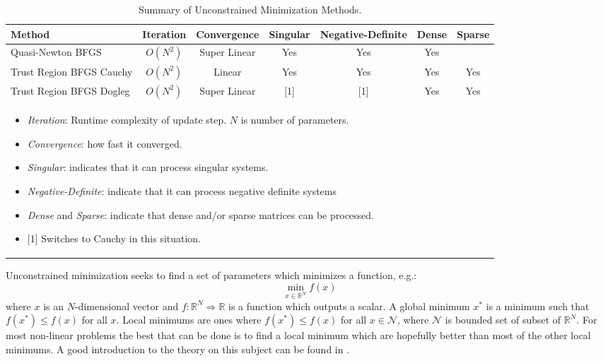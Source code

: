 \documentclass[peerreview,compsoc,onecolumn]{IEEEtran}
\newcommand{\R}{\mathbb{R}}
\begin{document}
\begin{table}[h]
\caption{\label{summary:UM}Summary of Unconstrained Minimization Methods.}
\centering
\begin{tabular}{lcccccc}
Method & Iteration & Convergence & Singular & Negative-Definite & Dense & Sparse \\[1ex]
\hline
Quasi-Newton BFGS        & $O(N^2)$ & Super Linear & Yes & Yes & Yes &  \rule{0pt}{2.6ex} \\
Trust Region BFGS Cauchy & $O(N^2)$ & Linear       & Yes & Yes & Yes & Yes  \\
Trust Region BFGS Dogleg & $O(N^2)$ & Super Linear & [1] & [1] & Yes & Yes  \\[1ex]
\hline
\multicolumn{6}{l}{
\begin{minipage}{0.6\textwidth}
\centering
\vspace{2mm}
\begin{itemize}[leftmargin=*]
\item \emph{Iteration}: Runtime complexity of update step. $N$ is number of parameters.
\item \emph{Convergence}: how fast it converged.
\item \emph{Singular}: indicates that it can process singular systems.
\item \emph{Negative-Definite}: indicate that it can process negative definite systems
\item \emph{Dense} and \emph{Sparse}: indicate that dense and/or sparse matrices can be processed. 
\item {[1]} Switches to Cauchy in this situation.
\end{itemize}
\end{minipage}
 }
\end{tabular}
\end{table}

Unconstrained minimization seeks to find a set of parameters which minimizes a function, e.g.:
\begin{equation}
\min\limits_{x \in \R^N} f(x)
\end{equation}
where $x$ is an $N$-dimensional vector and $f : \R^N \Rightarrow \R $ is a function which outputs a scalar. A global minimum $x^*$ is a minimum such that $f(x^*) \le f(x)$ for all $x$. Local minimums are ones where $f(x^*) \le f(x)$ for all $x \in \mathcal{N}$, where $\mathcal{N}$ is bounded set of subset of $\R^N$. For most non-linear problems the best that can be done is to find a local minimum which are hopefully better than most of the other local minimums. A good introduction to the theory on this subject can be found in \cite{numopt2006}.
\end{document}
